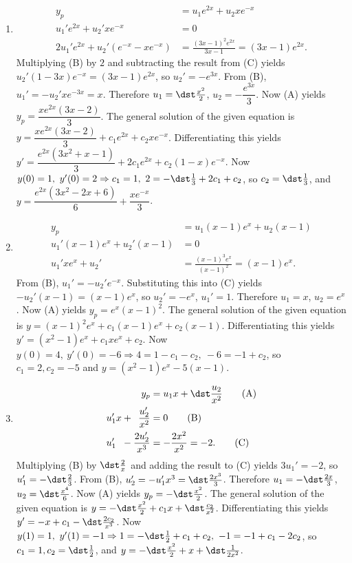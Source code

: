 \documentclass[openany]{book}
\newenvironment{sectionSolutions}{
 \begin{enumerate}[item-label={\thesection.\arabic{enumi}.}]
}{
 \end{enumerate}
}
\begin{document}
\begin{sectionSolutions}
\item
\begin{align*}
y_p&=u_1e^{2x}+u_2xe^{-x}\tag{A}\\
u_1'e^{2x}+u_2'xe^{-x}&=0\tag{B}\\
2u_1'e^{2x}+u_2'(e^{-x}-xe^{-x})&=\frac{(3x-1)^2e^{2x}}{
3x-1}=(3x-1)e^{2x}.\tag{C}
\end{align*}
Multiplying (B) by $2$ and subtracting the result
from (C) yields $u_2'(1-3x)e^{-x}=(3x-1)e^{2x}$, so
$u_2'=-e^{3x}$. From (B), $u_1'=-u_2'xe^{-3x}=x$.
Therefore $u_1=\dst\frac{x^2}{2}$, $u_2=-\dfrac{e^{3x}}{3}$. Now (A)
yields $y_p=\dfrac{xe^{2x}(3x-2)}{3}$. The general solution of the
given equation is $y=\dfrac{xe^{2x}(3x-2)}{3}+c_1e^{2x}+c_2xe^{-x}$.
Differentiating this yields
$y'=\dfrac{e^{2x}(3x^2+x-1)}{3}+2c_1e^{2x}+c_2(1-x)e^{-x}$. Now
$y(0)=1,\ y'(0)=2\Rightarrow c_1=1,\ 2=-\dst\frac{1}{3} +2c_1+c_2$, so
$c_2=\dst\frac{1}{3}$, and
$y=\dfrac{e^{2x}(3x^2-2x+6)}{6}+\dfrac{xe^{-x}}{3}$.

\item
\begin{align*}
y_p&=u_1(x-1)e^x+u_2(x-1)\tag{A}\\
u_1'(x-1)e^x+u_2'(x-1)&=0 \tag{B}\\
u_1'xe^x+u_2'&=\frac{(x-1)^3e^x}{(x-1)^2}=(x-1)e^x.\tag{C}
\end{align*}
From (B), $u_1'=-u_2'e^{-x}$. Substituting this into
(C) yields $-u_2'(x-1)=(x-1)e^x$, so $u_2'=-e^x$,
$u_1'=1$. Therefore $u_1=x$, $u_2=e^x$. Now (A) yields
$y_p=e^x(x-1)^2$. The general solution of the given equation is
$y=(x-1)^2e^x+c_1(x-1)e^x+c_2(x-1)$. Differentiating this yields
$y'=(x^2-1)e^x+c_1xe^x+c_2$. Now $y(0)=4,\ y'(0)=-6\Rightarrow
4=1-c_1-c_2,\ -6=-1+c_2$, so $c_1=2, c_2=-5$ and
$y=(x^2-1)e^x-5(x-1)$.


\item
\begin{align*}
y_p&=u_1x+\dst\frac{u_2}{ x^2}\tag{A}\\
u_1'x+\phantom{2}\frac{u_2'}{ x^2}&=0\tag{B}\\
u_1'\phantom{x}-\frac{2u_2'}{ x^3}&=-\frac{2x^2}{x^2}=-2.\tag{C}
\end{align*}
Multiplying (B) by $\dst\frac{2}{ x}$ and adding the
result to (C) yields $3u_1'=-2$, so
$u_1'=-\dst\frac{2}{3}$. From (B),
$u_2'=-u_1'x^3=\dst\frac{2x^3}{3}$. Therefore $u_1=-\dst\frac{2x}{3}$,
$u_2=\dst\frac{x^4}{6}$. Now (A) yields $y_p=-\dst\frac{x^2}{2}$. The
general solution of the given equation is
$y=-\dst\frac{x^2}{2}+c_1x+\dst\frac{c_2}{ x^2}$. Differentiating this
yields $y'=-x+c_1-\dst\frac{2c_2}{ x^3}$. Now $y(1)=1,\
y'(1)=-1\Rightarrow 1=-\dst\frac{1}{2}+c_1+c_2,\ -1=-1+c_1-2c_2$, so
$c_1=1, c_2=\dst\frac{1}{2}$, and
$y=-\dst\frac{x^2}{2}+x+\dst\frac{1}{2x^2}$.





\end{sectionSolutions}
\end{document}
